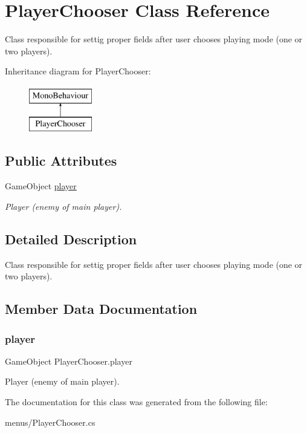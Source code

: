 \hypertarget{class_player_chooser}{}\section{Player\+Chooser Class Reference}
\label{class_player_chooser}


Class responsible for settig proper fields after user chooses playing mode (one or two players).  


Inheritance diagram for Player\+Chooser\+:\begin{figure}[H]
\begin{center}
\leavevmode
\includegraphics[height=2.000000cm]{class_player_chooser}
\end{center}
\end{figure}
\subsection*{Public Attributes}
\begin{DoxyCompactItemize}
\item 
Game\+Object \mbox{\hyperlink{class_player_chooser_a0b6190b6135c1cda958ac9d079a254c8}{player}}
\begin{DoxyCompactList}\small\item\em Player (enemy of main player). \end{DoxyCompactList}\end{DoxyCompactItemize}


\subsection{Detailed Description}
Class responsible for settig proper fields after user chooses playing mode (one or two players). 



\subsection{Member Data Documentation}
\mbox{\label{class_player_chooser_a0b6190b6135c1cda958ac9d079a254c8}} 
\subsubsection{\texorpdfstring{player}{player}}
{\footnotesize\ttfamily Game\+Object Player\+Chooser.\+player}



Player (enemy of main player). 



The documentation for this class was generated from the following file\+:\begin{DoxyCompactItemize}
\item 
menus/Player\+Chooser.\+cs\end{DoxyCompactItemize}
